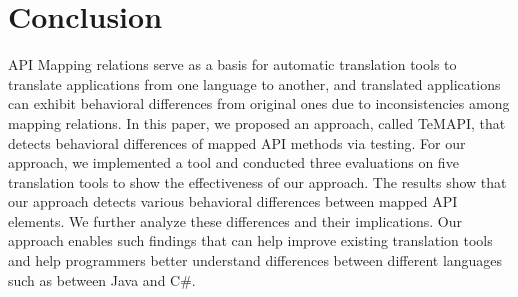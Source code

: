 \section{Conclusion}
\label{sec:conclusion}

API Mapping relations serve as a basis for automatic translation tools to translate applications from one language to another, and translated applications can exhibit behavioral differences from original ones due to inconsistencies among mapping relations. In this paper, we proposed an approach, called TeMAPI, that detects behavioral differences of mapped API methods via testing. For our approach, we implemented a tool and conducted three evaluations on five translation tools to show the effectiveness of our approach. The results show that our approach detects various behavioral differences between mapped API elements. We further analyze these differences and their implications. Our approach enables such findings that can help improve existing translation tools and help programmers better understand differences between different languages such as between Java and C\#.

